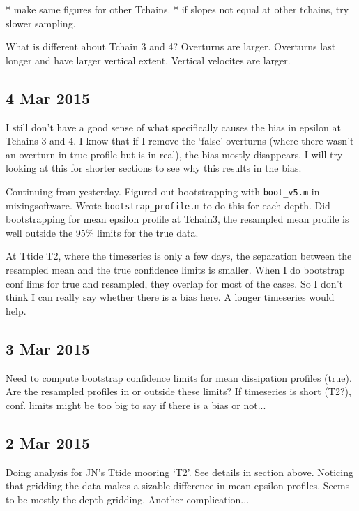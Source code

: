 \documentclass[11pt]{article}
\begin{document}
* make same figures for other Tchains.
* if slopes not equal at other tchains, try slower sampling.

What is different about Tchain 3 and 4? Overturns are larger. Overturns last longer and have larger vertical extent. Vertical velocites are larger.


\clearpage
\newpage
\subsection{4 Mar 2015}


I still don't have a good sense of what specifically causes the bias in epsilon at Tchains 3 and 4. I know that if I remove the `false' overturns (where there wasn't an overturn in true profile but is in real), the bias mostly disappears. I will try looking at this for shorter sections to see why this results in the bias.


\vspace{1cm}

Continuing from yesterday. Figured out bootstrapping with \verb+boot_v5.m+ in mixingsoftware. Wrote \verb+bootstrap_profile.m+ to do this for each depth. Did bootstrapping for mean epsilon profile at Tchain3, the resampled mean profile is well outside the 95\% limits for the true data.


At Ttide T2, where the timeseries is only a few days, the separation between the resampled mean and the true confidence limits is smaller. When I do bootstrap conf lims for true and resampled, they overlap for most of the cases. So I don't think I can really say whether there is a bias here. A longer timeseries would help. 


\clearpage
\newpage
\subsection{3 Mar 2015}

Need to compute bootstrap confidence limits for mean dissipation profiles (true). Are the resampled profiles in or outside these limits? If timeseries is short (T2?), conf. limits might be too big to say if there is a bias or not...




\clearpage
\newpage
\subsection{2 Mar 2015}

Doing analysis for JN's Ttide mooring `T2'. See details in section above. Noticing that gridding the data makes a sizable difference in mean epsilon profiles. Seems to be mostly the depth gridding. Another complication...
\end{document}
